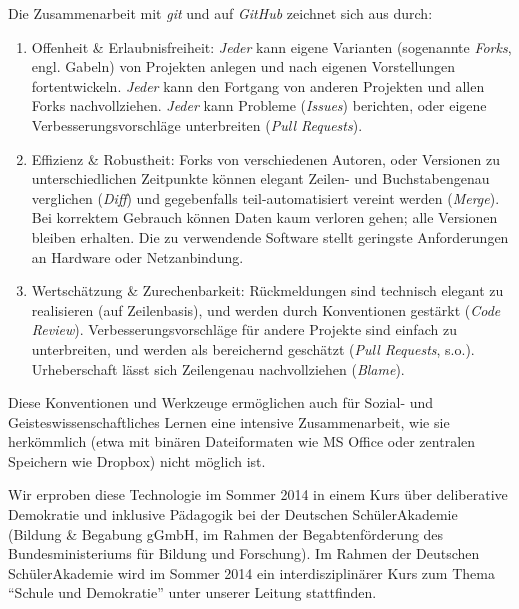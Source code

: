 \documentclass[11pt,a4paper,oneside]{article}
\begin{document}
Die Zusammenarbeit mit \emph{git} und auf \emph{GitHub} zeichnet sich aus durch:
\begin{enumerate}
	\item Offenheit \& Erlaubnisfreiheit:
		\emph{Jeder} kann eigene Varianten (sogenannte \emph{Forks}, engl. Gabeln) von Projekten anlegen und nach eigenen Vorstellungen fortentwickeln.
		\emph{Jeder} kann den Fortgang von anderen Projekten und allen Forks nachvollziehen.
		\emph{Jeder} kann Probleme (\emph{Issues}) berichten, oder eigene Verbesserungsvorschläge unterbreiten (\emph{Pull Requests}).
	\item Effizienz \& Robustheit:
		Forks von verschiedenen Autoren, oder Versionen zu unterschiedlichen Zeitpunkte können elegant Zeilen- und Buchstabengenau verglichen (\emph{Diff}) und gegebenfalls teil-automatisiert vereint werden (\emph{Merge}).
		Bei korrektem Gebrauch können Daten kaum verloren gehen; alle Versionen bleiben erhalten.
		Die zu verwendende Software stellt geringste Anforderungen an Hardware oder Netzanbindung.
	\item Wertschätzung \& Zurechenbarkeit:
		Rückmeldungen sind technisch elegant zu realisieren (auf Zeilenbasis), und werden durch Konventionen gestärkt (\emph{Code Review}).
		Verbesserungsvorschläge für andere Projekte sind einfach zu unterbreiten, und werden als bereichernd geschätzt (\emph{Pull Requests}, s.o.).
		Urheberschaft lässt sich Zeilengenau nachvollziehen (\emph{Blame}).
\end{enumerate}

Diese Konventionen und Werkzeuge ermöglichen auch für Sozial- und Geisteswissenschaftliches Lernen eine intensive Zusammenarbeit, wie sie herkömmlich (etwa mit binären Dateiformaten wie MS Office oder zentralen Speichern wie Dropbox) nicht möglich ist.

Wir erproben diese Technologie im Sommer 2014 in einem Kurs über deliberative Demokratie und inklusive Pädagogik bei der Deutschen SchülerAkademie (Bildung \& Begabung gGmbH, im Rahmen der Begabtenförderung des Bundesministeriums für Bildung und Forschung).
Im Rahmen der Deutschen SchülerAkademie wird im Sommer 2014 ein interdisziplinärer Kurs zum Thema ``Schule und Demokratie'' unter unserer Leitung stattfinden.
\end{document}
